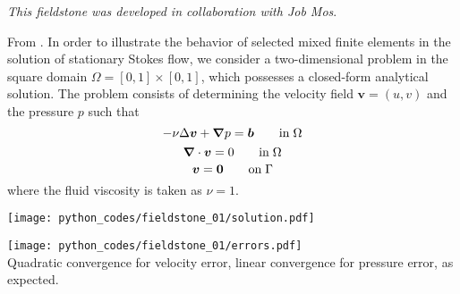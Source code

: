 
{\sl This fieldstone was developed in collaboration with Job Mos}.

From \cite{dohu}. In order to illustrate the behavior of selected mixed finite elements in the solution 
of stationary Stokes flow,  we consider a two-dimensional problem 
in the square domain $\Omega=[0,1]\times[0,1]$, which possesses a closed-form analytical 
solution. The problem consists of determining the velocity field ${\bm v} = (u,v)$ and the 
pressure $p$ such that 
\[
-\nu \Delta {\bm v} + {\bm \nabla} p = {\bm b}  \quad\quad {\rm in} \; \Omega
\]
\[
{\bm \nabla} \cdot {\bm v} = 0 \quad\quad {\rm in} \; \Omega
\]
\[
{\bm v}={\bm 0} \quad\quad {\rm on} \; \Gamma
\]
where the fluid viscosity is taken as $\nu=1$. 



\texttt{[image: python\_codes/fieldstone\_01/solution.pdf]}

\begin{center}
\texttt{[image: python\_codes/fieldstone\_01/errors.pdf]}\\
Quadratic convergence for velocity error, 
linear convergence for pressure error, as expected.
\end{center}

